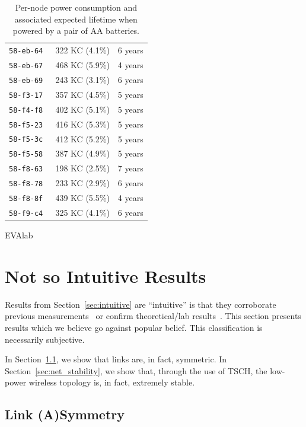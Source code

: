 \documentclass{elsarticle}
\begin{document}
\begin{table}
\begin{subtable}{.43\textwidth}
\begin{tabular}{|c|c|c|}
        \tt{58-eb-64} &  322 KC (4.1\%)  &  6 years \\
        \tt{58-eb-67} &  468 KC (5.9\%)  &  4 years \\
        \tt{58-eb-69} &  243 KC (3.1\%)  &  6 years \\
        \tt{58-f3-17} &  357 KC (4.5\%)  &  5 years \\
        \tt{58-f4-f8} &  402 KC (5.1\%)  &  5 years \\
        \tt{58-f5-23} &  416 KC (5.3\%)  &  5 years \\
        \tt{58-f5-3c} &  412 KC (5.2\%)  &  5 years \\
        \tt{58-f5-58} &  387 KC (4.9\%)  &  5 years \\
        \tt{58-f8-63} &  198 KC (2.5\%)  &  7 years \\
        \tt{58-f8-78} &  233 KC (2.9\%)  &  6 years \\
        \tt{58-f8-8f} &  439 KC (5.5\%)  &  4 years \\
        \tt{58-f9-c4} &  325 KC (4.1\%)  &  6 years \\
        \bottomrule
    \end{tabular}
    \caption{EVAlab}
\end{subtable}\hfill
\caption{Per-node power consumption and associated expected lifetime when powered by a pair of AA batteries.}
\label{tab:stats_charge}
\end{table}
\section{Not so Intuitive Results}
\label{sec:notsointuitive}

Results from Section~\ref{sec:intuitive} are ``intuitive'' is that they corroborate previous measurements~\cite{watteyne16peach} or confirm theoretical/lab results~\cite{watteyne10mitigating,watteyne09reliability,watteyne15industrial}.
This section presents results which we believe go against popular belief.
This classification is necessarily subjective.

In Section~\ref{sec:symmetry}, we show that links are, in fact, symmetric.
In Section~\ref{sec:net_stability}, we show that, through the use of TSCH, the low-power wireless topology is, in fact, extremely stable.

\subsection{Link (A)Symmetry}
\label{sec:symmetry}
\end{document}
